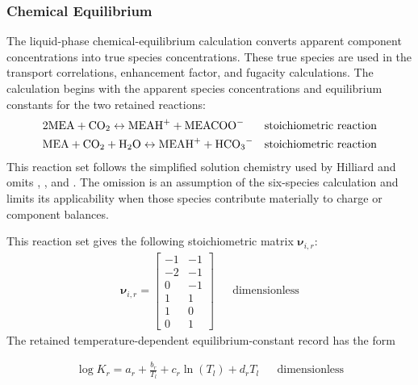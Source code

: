             \subsubsection{Chemical Equilibrium}
                The liquid-phase chemical-equilibrium calculation converts apparent component concentrations into true species concentrations. These true species are used in the transport correlations, enhancement factor, and fugacity calculations. The calculation begins with the apparent species concentrations and equilibrium constants for the two retained reactions:
                \begin{align}
                    & 2 \MEA+\COtwo \leftrightarrow \MEAH +\MEACOO
                    && \text{stoichiometric reaction} \\
                    & \MEA+\COtwo+\HtwoO \leftrightarrow \MEAH +\HCOthree
                    && \text{stoichiometric reaction}
                \end{align}
                This reaction set follows the simplified solution chemistry used by Hilliard \cite{Hilliard2008} and omits , , and . The omission is an assumption of the six-species calculation and limits its applicability when those species contribute materially to charge or component balances.

                This reaction set gives the following stoichiometric matrix $\mathbf{\nu}_{i,r}$:
                \begin{align}
                    \mathbf{\nu}_{i, r} =
                    \begin{bmatrix}
                    -1 & -1 \\
                    -2 & -1 \\
                     0 & -1 \\
                     1 &  1 \\
                     1 &  0 \\
                     0 &  1
                    \end{bmatrix}
                    && \text{dimensionless}
                \end{align}
                The retained temperature-dependent equilibrium-constant record has the form

                \begin{align}
                    \log K_r = a_r + \frac{b_r}{T_l} + c_r \ln(T_l) + d_r T_l
                    && \text{dimensionless}
                \end{align}

